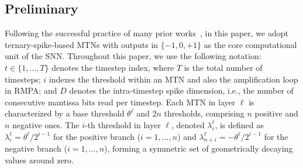 
\subsection{Preliminary}
\label{sec:pre}


 
Following the successful practice of many prior works~\cite{you2024spikezip,wang2022signed,huang2025differential,huang2024towards}, in this paper, we adopt ternary-spike-based MTNs with outputs in $\{-1, 0, +1\}$ as the core computational unit of the SNN. Throughout this paper, we use the following notation: $t \in \{1, \ldots, T\}$ denotes the timestep index, where $T$ is the total number of timesteps; $i$ indexes the threshold within an MTN and also the amplification loop in RMPA; and $D$ denotes the intra-timestep spike dimension, i.e., the number of consecutive mantissa bits read per timestep.
Each MTN in layer $\ell$ is characterized by a base threshold $\theta^\ell$ and $2n$ thresholds, comprising $n$ positive and $n$ negative ones. The $i$-th threshold in layer $\ell$, denoted $\lambda_i^\ell$, is defined as $\lambda_i^\ell = \theta^\ell / 2^{i-1}$ for the positive branch ($i = 1, \ldots, n$) and $\lambda_{n+i}^\ell = -\theta^\ell / 2^{i-1}$ for the negative branch ($i = 1, \ldots, n$), forming a symmetric set of geometrically decaying values around zero.


